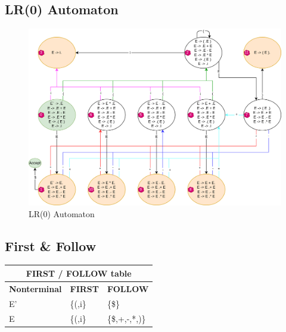 \subsection{LR(0) Automaton}
\begin{figure}[!h]
	\centering
	\includegraphics[width=\textwidth]{../EXP7/automaton.png}
	\caption{LR(0) Automaton}
\end{figure}

\subsection{First \& Follow}
\begin{table}[!h]
	\centering
	\begin{tabular}{|lll|}
		\hline
		\multicolumn{3}{|c|}{\textbf{FIRST / FOLLOW table}}                      \\ \hline
		\multicolumn{1}{|c|}{\textbf{Nonterminal}} & \multicolumn{1}{c|}{\textbf{FIRST}} & \multicolumn{1}{c|}{\textbf{FOLLOW}} \\ \hline
		\multicolumn{1}{|l|}{E'} & \multicolumn{1}{l|}{\{(,i\}} & \{\$\}         \\ \hline
		\multicolumn{1}{|l|}{E}  & \multicolumn{1}{l|}{\{(,i\}} & \{\$,+,-,*,)\} \\ \hline
	\end{tabular}
\end{table}


